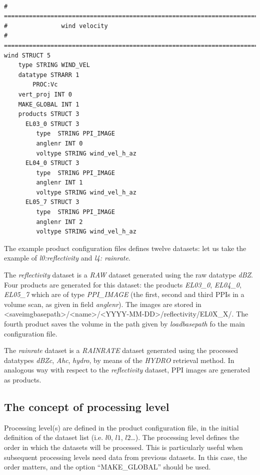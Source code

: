 \documentclass[a4paper,11pt,pdftex,twoside]{scrartcl}
\begin{document}
{{{\begin{verbatim}
			
# ==========================================================================================
#               wind velocity
# ==========================================================================================
wind STRUCT 5
    type STRING WIND_VEL
    datatype STRARR 1
        PROC:Vc
    vert_proj INT 0
    MAKE_GLOBAL INT 1
    products STRUCT 3      
      EL03_0 STRUCT 3
         type  STRING PPI_IMAGE
         anglenr INT 0
         voltype STRING wind_vel_h_az
      EL04_0 STRUCT 3
         type  STRING PPI_IMAGE
         anglenr INT 1
         voltype STRING wind_vel_h_az
      EL05_7 STRUCT 3
         type  STRING PPI_IMAGE
         anglenr INT 2
         voltype STRING wind_vel_h_az
\end{verbatim}

The example product configuration files defines twelve datasets: let us take the example of \emph{l0:reflectivity}
and \emph{l4: rainrate}.

The \emph{reflectivity} dataset is a \emph{RAW} dataset generated using the raw
datatype \emph{dBZ}. Four products are generated for this dataset: the products
\emph{EL03\_0}, \emph{EL04\_0}, \emph{EL05\_7} which are of type \emph{PPI\_IMAGE} (the first, second and third PPIs in a volume scan, as given in field \emph{anglenr}). The images are stored in
<saveimgbasepath>/<name>/<YYYY-MM-DD>/reflectivity/EL0X\_X/. The fourth product saves the volume in the path given by \emph{loadbasepath} fo the main configuration file. 

The \emph{rainrate} dataset is a \emph{RAINRATE} dataset generated using the processed
datatypes \emph{dBZc}, \emph{Ahc}, \emph{hydro}, by means of the \emph{HYDRO} retrieval method.
In analogous way with respect to the \emph{reflectivity} dataset, PPI images are generated as products.

\subsection{The concept of processing level}

Processing level(s) are defined in the product configuration file, in  the initial definition of the dataset list (i.e. $l0$, $l1$, $l2$\dots). The processing level defines the order in which the datasets
will be processed. This is particularly useful when subsequent processing levels need data from previous datasets. In this case, the order matters, and the option ``MAKE\_GLOBAL'' should be used. 

\newpage

}}}
\end{document}
